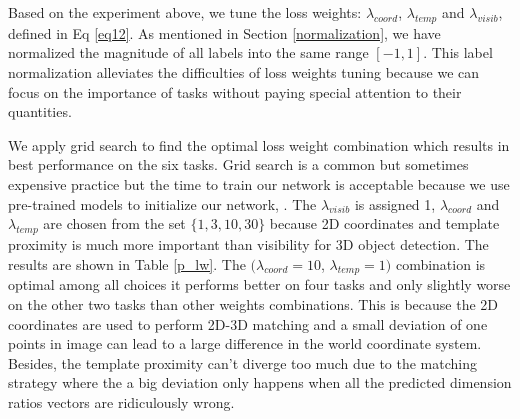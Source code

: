 Based on the experiment above, we tune the loss weights: $\lambda_{coord}$, $\lambda_{temp}$ and $\lambda_{visib}$, defined in Eq \ref{eq12}. As mentioned in Section \ref{normalization}, we have normalized the magnitude of all labels into the same range $[-1, 1]$. This label normalization alleviates the difficulties of loss weights tuning because we can focus on the importance of tasks without paying special attention to their quantities.


We apply grid search to find the optimal loss weight combination which results in best performance on the six tasks. Grid search is a common but sometimes expensive practice \cite{Goodfellow-et-al-2016} but the time to train our network is acceptable because we use pre-trained models to initialize our network, . The $\lambda_{visib}$ is assigned 1, $\lambda_{coord}$ and $\lambda_{temp}$ are chosen from the set $\{1, 3, 10, 30\}$ because 2D coordinates and template proximity is much more important than visibility for 3D object detection. The results are shown in Table \ref{p_lw}. The $(\lambda_{coord}=10$, $\lambda_{temp}=1)$ combination is optimal among all choices \ie it performs better on four tasks and only slightly worse on the other two tasks than other weights combinations. This is because the 2D coordinates are used to perform 2D-3D matching and a small deviation of one points in image can lead to a large difference in the world coordinate system. Besides, the template proximity can't diverge too much due to the matching strategy where the a big deviation only happens when all the predicted dimension ratios vectors are ridiculously wrong.


